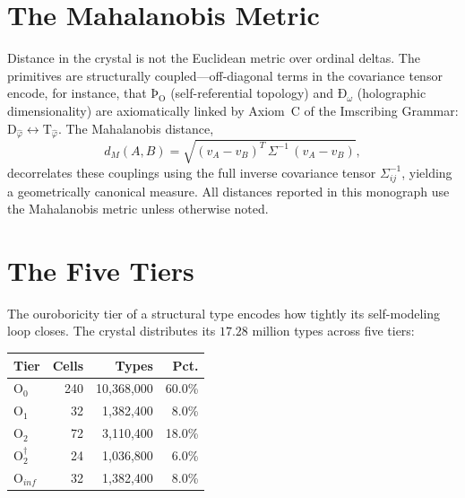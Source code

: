 \documentclass[12pt,twoside]{book}
\theoremstyle{definition}
\newcommand{\prim}[1]{\text{#1}}
\newcommand{\tier}[1]{\text{O}_{#1}}
\begin{document}
\section{The Mahalanobis Metric}

Distance in the crystal is not the Euclidean metric over ordinal deltas. The primitives are structurally coupled---off-diagonal terms in the covariance tensor encode, for instance, that $\text{Þ}_{\text{O}}$ (self-referential topology) and $\text{Ð}_{\omega}$ (holographic dimensionality) are axiomatically linked by Axiom~C of the Imscribing Grammar: $\prim{D}_{\hat{\varphi}} \leftrightarrow \prim{T}_{\hat{\varphi}}$. The Mahalanobis distance,
\begin{equation}
d_M(A, B) = \sqrt{(v_A - v_B)^T \, \Sigma^{-1} \, (v_A - v_B)},
\end{equation}
decorrelates these couplings using the full inverse covariance tensor $\Sigma^{-1}_{ij}$, yielding a geometrically canonical measure. All distances reported in this monograph use the Mahalanobis metric unless otherwise noted.

\section{The Five Tiers}

The ouroboricity tier of a structural type encodes how tightly its self-modeling loop closes. The crystal distributes its $17.28$ million types across five tiers:
\begin{center}
\begin{tabular}{lrrr}
\toprule
\textbf{Tier} & \textbf{Cells} & \textbf{Types} & \textbf{Pct.} \\
\midrule
$\tier{0}$   & 240 & 10,368,000 & 60.0\% \\
$\tier{1}$   &  32 &  1,382,400 &  8.0\% \\
$\tier{2}$   &  72 &  3,110,400 & 18.0\% \\
$\tier{2}^{\dagger}$ & 24 & 1,036,800 & 6.0\% \\
$\tier{inf}$ & 32 & 1,382,400 & 8.0\% \\
\bottomrule
\end{tabular}
\end{center}
\end{document}
